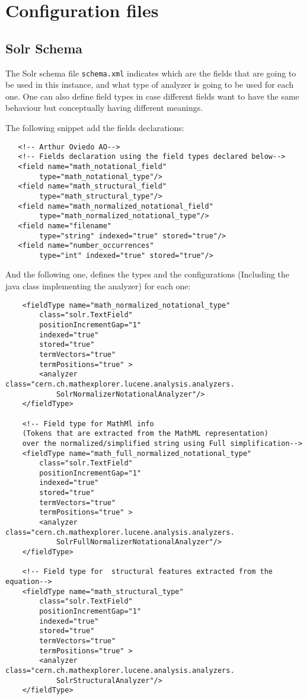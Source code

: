 \chapter{Configuration files}

\section{Solr Schema}
The Solr schema file \verb|schema.xml| indicates which are the fields that are going to be used in this instance, and what type of analyzer is going to be used for each one. One can also define field types in case different fields want to have the same behaviour but conceptually having different meanings. 

The following snippet add the fields declarations:

\begin{verbatim}
   <!-- Arthur Oviedo AO-->
   <!-- Fields declaration using the field types declared below-->
   <field name="math_notational_field" 
   		type="math_notational_type"/>
   <field name="math_structural_field" 
   		type="math_structural_type"/>
   <field name="math_normalized_notational_field" 
   		type="math_normalized_notational_type"/>
   <field name="filename" 
   		type="string" indexed="true" stored="true"/>
   <field name="number_occurrences" 
   		type="int" indexed="true" stored="true"/>
\end{verbatim}

And the following one, defines the types and the configurations (Including the java class implementing the analyzer) for each one:

\begin{verbatim}
	<fieldType name="math_normalized_notational_type" 
		class="solr.TextField" 
		positionIncrementGap="1"
		indexed="true" 
		stored="true" 
		termVectors="true" 
		termPositions="true" >
		<analyzer class="cern.ch.mathexplorer.lucene.analysis.analyzers.
			SolrNormalizerNotationalAnalyzer"/>
	</fieldType>
	
	<!-- Field type for MathMl info 
	(Tokens that are extracted from the MathML representation)
	over the normalized/simplified string using Full simplification-->
	<fieldType name="math_full_normalized_notational_type" 
		class="solr.TextField" 
		positionIncrementGap="1"
		indexed="true" 
		stored="true" 
		termVectors="true" 
		termPositions="true" >
		<analyzer class="cern.ch.mathexplorer.lucene.analysis.analyzers.
			SolrFullNormalizerNotationalAnalyzer"/>
	</fieldType>
	
	<!-- Field type for  structural features extracted from the equation-->
	<fieldType name="math_structural_type" 
		class="solr.TextField" 
		positionIncrementGap="1"
		indexed="true" 
		stored="true" 
		termVectors="true" 
		termPositions="true" >
		<analyzer class="cern.ch.mathexplorer.lucene.analysis.analyzers.
			SolrStructuralAnalyzer"/>
	</fieldType>

\end{verbatim}
 
